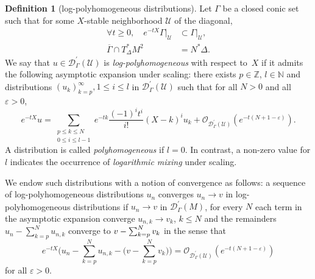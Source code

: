 \documentclass[10pt]{amsart}
\let\pazocal\mathscr
\theoremstyle{definition}
\newtheorem{definition}[theorem]{Definition}
\newcommand\nn{{\mathbb N}}
\let\euler X
\begin{document}
\begin{definition}[log-polyhomogeneous distributions]
Let $\Gamma$ be a closed conic set
such that for some $\euler$-stable neighborhood $\pazocal{U}$ of the diagonal,
\begin{align*}
\forall t\geqslant 0, \quad e^{-t\euler}\Gamma|_\pazocal{U}&\subset \Gamma|_{\pazocal{U}},\\
\overline{\Gamma}\cap T^*_\Delta M^2&=N^*\Delta.
\end{align*}
We say that $u\in \pazocal{D}^\prime_\Gamma(\pazocal{U})$ is \emph{log-polyhomogeneous} with respect to~$\euler$ if
it admits the following asymptotic expansion under scaling: there exists $p\in \mathbb{Z}$, {$l\in \nn$}
and distributions $(u_k)_{k=p}^{\infty}, 1\leqslant i \leqslant l $
in $\pazocal{D}^\prime_\Gamma(\pazocal{U})$ such that for all $N>0$ and all $\varepsilon>0$,
\begin{equation}\label{phexp}
e^{-t\euler}u=\sum_{\substack{p\leqslant k\leqslant N\\0\leqslant i\leqslant l-1}} e^{-tk} \frac{(-1)^i t^i}{i!}\left(\euler-k\right)^i u_k +\pazocal{O}_{\pazocal{D}^\prime_\Gamma(\pazocal{U})}(e^{-t(N+1-\varepsilon)}).
\end{equation}
A distribution is called \emph{polyhomogeneous} if $l=0$. In contrast, a non-zero value for $l$ indicates the occurrence of \emph{logarithmic mixing} under scaling.

We endow such {distributions} with a notion of convergence as follows: a sequence of
log-polyhomogeneous {distributions} $u_n$ converges
$u_n\to v$ in log-polyhomogeneous {distributions} if
$u_n\to v$ in $\pazocal{D}^\prime_\Gamma(M)$, for every $N$ each term in the asymptotic expansion converge
$u_{n,k}\to v_{k}$, $k\leqslant N $ and the remainders $u_n-\sum_{k=p}^N u_{n,k} $ converge to $v-\nobreak\sum_{k=p}^N v_{k} $ in the sense that
\[
e^{-t\euler}\bigg(u_n-\sum_{k=p}^N u_{n,k}- \Big(v-\sum_{k=p}^N v_{k} \Big)\bigg)=\pazocal{O}_{\pazocal{D}^\prime_\Gamma(\pazocal{U})}(e^{-t(N+1-\varepsilon)})
\]
for all
$\varepsilon>0$.
\end{definition}
\end{document}
